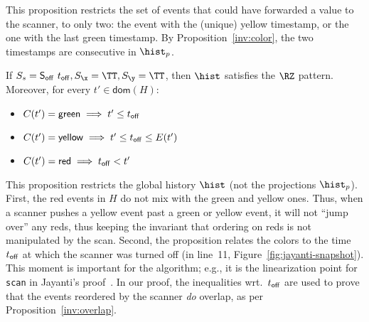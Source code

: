 This proposition restricts the set of events that could have forwarded
a value to the scanner, to only two: the event with the (unique)
yellow timestamp, or the one with the last green timestamp. By
Proposition~\ref{inv:color}, the two timestamps are consecutive in
$\histp$.
 
\begin{proposition}\label{inv:redzone}%
If $\sss = \sOff\ \toff, \sx = \TT, \sy = \TT$, then $\hist$ satisfies
the $\RZ$ pattern. Moreover, for every $t' \in \mathsf{dom}(H)$:
%
\begin{itemize}
\item $C(t') = \mathsf{green} \implies t' \leq t_{\mathsf{off}}$
\item $C(t') = \mathsf{yellow} \implies t' \leq t_{\mathsf{off}} \leq E (t')$
\item $C(t') = \mathsf{red} \implies t_{\mathsf{off}} < t'$  
\end{itemize}
\end{proposition}

This proposition restricts the global history $\hist$ (not the
projections $\histp$). First, the red events in $H$ do not mix with
the green and yellow ones. Thus, when a scanner pushes a yellow event
past a green or yellow event, it will not ``jump over'' any reds, thus
keeping the invariant that ordering on reds is not manipulated by the
scan. Second, the proposition relates the colors to the time $t_{\mathsf{off}}$
at which the scanner was turned off (in line~11,
Figure~\ref{fig:jayanti-snapshot}). This moment is important for the
algorithm; e.g., it is the linearization point for {\tt scan} in
Jayanti's proof~\cite{Jayanti:STOC05}.
%
In our proof, the inequalities wrt.~$t_{\mathsf{off}}$ are used to prove that the
events reordered by the scanner \emph{do} overlap, as per
Proposition~\ref{inv:overlap}.

\begin{comment}
Proposition~\ref{inv:readFP} states that any non-$\bot$ value read
from the forwarding pointer $\mathit{fp}$ at line 12 might have been
written to $p$ after the scanner cleared the forwarding pointers, and
and hence, be newer than the values read in line 10. This captures the
essence of the first part of Jayanti's Second forwarding principle.
%
Proposition~\ref{inv:redzone} states that when the scanner is in
between lines 12-15 in Figure~\ref{fig:jayanti-snapshot}, then $\hist$
can be partitioned into a non-empty prefix with yellow and/or green
timestamps, and a reds-only suffix. Moreover, if a new write event $t$
occurs at this point, with $ \toff < t <= \E (t)$, it will be colored
red and hence ignored by the current scanner. This later fact captures
the last part of the second Forwarding Principle. Later on, this
proposition will be crucial into proving that relink does not affect
the order of write events that are meant to missed, by keeping them in
the red suffix, and also that those being reordered are overlapping.

\gad{Explain better? The second part of this invariant might also be
  connected to Jayanti's ``Correctness'' Theorem, Lemma 5 in his
  Appendix. I'm not sure however if I need to express its connection
  here.}
\end{comment}

